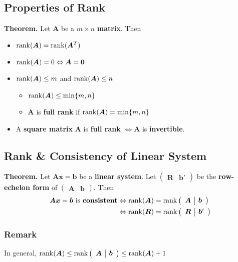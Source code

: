 \documentclass[../ma2001_notes.tex]{subfiles}
\begin{document}
\subsection{Properties of Rank}
\textbf{Theorem.} Let \(\bm{A}\) be a \(m\times n\) \textbf{matrix}. Then
\begin{itemize}
	\item\(\operatorname{rank}(\bm{A})=\operatorname{rank}(\bm{A}^T)\)
	\item\(\operatorname{rank}(\bm{A})=0\Leftrightarrow\bm{A}=\bm{0}\)
	\item\(\operatorname{rank}(\bm{A})\leq m\) and \(\operatorname{rank}(\bm{A})\leq n\)
	\begin{itemize}
		\item\(\operatorname{rank}(\bm{A})\leq\min\{m,n\}\)
		\item\(\bm{A}\) is \textbf{full rank} if \(\operatorname{rank}(\bm{A})=\min\{m,n\}\)
	\end{itemize}
	\item A \textbf{square matrix} \(\bm{A}\) is \textbf{full rank} \(\Leftrightarrow\bm{A}\) is \textbf{invertible}.
\end{itemize}

\subsection{Rank \& Consistency of Linear System}
\textbf{Theorem.} Let \(\bm{Ax}=\bm{b}\) be a \textbf{linear system}. Let \(\left(\begin{array}{c|c}
	\bm{R} & \bm{b}'
\end{array}\right)\) be the \textbf{row-echelon form} of \(\left(\begin{array}{c|c}
	\bm{A} & \bm{b}
\end{array}\right)\). Then
\begin{align*}
	\bm{Ax}=\bm{b}\text{ is }\textbf{consistent}
	&\Leftrightarrow\operatorname{rank}(\bm{A})=\operatorname{rank}\left(\begin{array}{c|c}
		\bm{A} & \bm{b}
	\end{array}\right) \\
	&\Leftrightarrow\operatorname{rank}(\bm{R})=\operatorname{rank}\left(\begin{array}{c|c}
	\bm{R} & \bm{b}'
	\end{array}\right)
\end{align*}

\subsubsection{Remark}
In general, \(\operatorname{rank}(\bm{A})\leq\operatorname{rank}\left(\begin{array}{c|c}
	\bm{A} & \bm{b}
\end{array}\right)\leq\operatorname{rank}(\bm{A})+1\)
\end{document}
